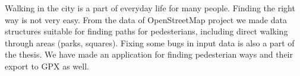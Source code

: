 Walking in the city is a part of everyday life for many people. Finding the right
way is not very easy. From the data of OpenStreetMap project we made data
structures suitable for finding paths for pedesterians, including direct walking through
areas (parks, squares). Fixing some bugs in input data is also a part of the
thesis. We have made an application for finding pedesterian ways and their export
to GPX as well.
